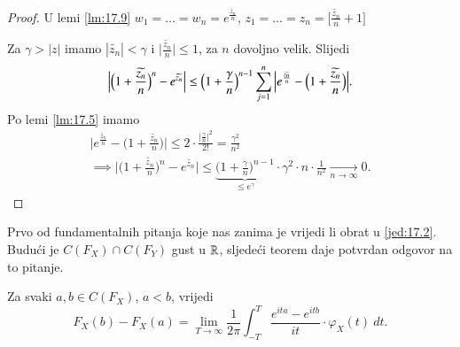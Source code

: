 \begin{proof}
    U lemi \ref{lm:17.9} $w_1 = \ldots = w_n = e^\frac{\widetilde{z_n}}{n}$, $z_1 = \ldots = z_n = \Big[ \frac{\widetilde{z_n}}{n} + 1 \Big]$

    Za $\gamma > |z|$ imamo $|\widetilde{z_n}| < \gamma$ i $\Big| \frac{\widetilde{z_n}}{n} \Big| \leq 1$, za $n$ dovoljno velik.
    Slijedi
    \begin{equation*}
        \Big| \Big( 1 + \frac{\widetilde{z_n}}{n} \Big)^n - e^{\widetilde{z_n}} \Big| \leq \Big(1 + \frac{\gamma}{n} \Big)^{n-1} \sum\limits_{j = 1}^{n} \Big| e^{\frac{\widetilde{z_n}}{n}} - \Big(1 + \frac{\widetilde{z_n}}{n}\Big) \Big|.
    \end{equation*}
    Po lemi \ref{lm:17.5} imamo
    \begin{equation*}
        \begin{gathered}
            \Big| e^{\frac{\widetilde{z_n}}{n}} - \Big( 1 + \frac{\widetilde{z_n}}{n} \Big) \Big| \leq 2 \cdot \frac{\Big| \frac{\gamma}{n}\Big|^2}{2!} = \frac{\gamma^2}{n^2}\\
            \implies \Big| \Big( 1 + \frac{\widetilde{z_n}}{n} \Big)^n - e^{\widetilde{z_n}} \Big| \leq \underbrace{\Big( 1 + \frac{\gamma}{n} \Big)^{n - 1}}_{\leq e^\gamma} \cdot \gamma^2 \cdot n \cdot \frac{1}{n^2} \xrightarrow[n \to \infty]{} 0.
        \end{gathered}
    \end{equation*}
\end{proof}

Prvo od fundamentalnih pitanja koje nas zanima je vrijedi li obrat u \eqref{jed:17.2}.
Budu\' ci je $C(F_X) \cap C(F_Y)$ gust u $\mathbb{R}$, sljede\' ci teorem daje potvrdan odgovor na to pitanje.

\begin{tm}  \label{tm:17.11}
    Za svaki $a, b \in C(F_X)$, $a < b$, vrijedi
    \begin{equation*}
        F_X (b) - F_X (a) = \lim\limits_{T \to \infty} \frac{1}{2 \pi} \int_{-T}^T \frac{e^{ita} - e^{itb}}{it} \cdot \varphi_X (t) \: d t.
    \end{equation*}
\end{tm}

